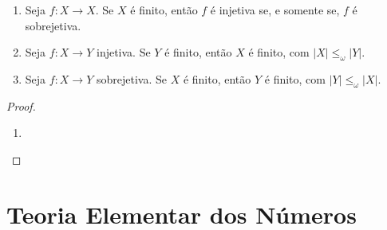\begin{proposition}
    \leavevmode
        \begin{enumerate}[leftmargin=*, align=left, label=\textbf{(\alph*)}]
            \item Seja $f:X \to X$. Se $X$ é finito, então $f$ é injetiva se, e somente se, $f$ é sobrejetiva. 
            \item Seja $f:X \to Y$ injetiva. Se $Y$ é finito, então $X$ é finito, com $|X| \leq_{\omega} |Y|$.
            \item Seja $f:X \to Y$ sobrejetiva. Se $X$ é finito, então $Y$ é finito, com $|Y| \leq_{\omega} |X|$.
        \end{enumerate}
\end{proposition}

\begin{proof}
    \leavevmode
        \begin{enumerate}[leftmargin=*, align=left, label=\textbf{(\alph*)}]
            \item \blackproof
        \end{enumerate}
\end{proof}

\section{Teoria Elementar dos Números}



